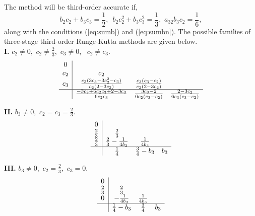\documentclass[a4paper, preprint,11pt]{elsarticle}
\numberwithin{equation}{section}
\begin{document}
The method will be third-order accurate if,
\begin{equation}\label{eq:rk_3_con}
b_2 c_2 + b_3 c_3 = \frac{1}{2},\,\,\, b_2 c_2^2 + b_3 c_3^2 = \frac{1}{3},\,\, a_{32} b_3 c_2 = \frac{1}{6},
\end{equation}
along with the conditions ({\ref{eq:sumb}}) and ({\ref{eq:sumbn}}). The possible families of three-stage third-order Runge-Kutta methods \cite{butcher2016numerical} are given below.\\

\noindent\textbf{I.} \(c_2 \neq 0\),\, \(c_2 \neq \frac{2}{3}\),\, \(c_3 \neq 0\), \, \(c_2 \neq c_3\).
\[
  \begin{array}{c|ccc}
    0 & \\
    c_2 & c_2 \\
    c_3 & \frac{c_3(3c_3 - 3c_2^2 - c_3)}{c_2(2 - 3c_2)} & \frac{c_3(c_3 - c_2)}{c_2(2 - 3c_2)} \\
    \hline
      & \frac{-3c_3 + 6c_2c_3 + 2 - 3c_3}{6c_2c_3} & \frac{3c_3 - 2}{6c_2(c_3 - c_2)} & \frac{2 - 3c_2}{6c_3(c_3 - c_2)} \\
  \end{array}
\]

\noindent\textbf{II.} \(b_3 \neq 0\),\, \(c_2 = c_3 = \frac{2}{3}\).
\[
  \begin{array}{c|ccc}
    0 & \\
    \frac{2}{3} & \frac{2}{3} \\
    \frac{2}{3} & \frac{2}{3} - \frac{1}{4b_3} & \frac{1}{4b_3} \\
    \hline
      & \frac{1}{4} & \frac{3}{4} - b_3 & b_3 \\
  \end{array}
\]

\noindent\textbf{III.} \(b_3 \neq 0\),\, \(c_2 = \frac{2}{3}\),\, \(c_3 = 0 \).
\[
  \begin{array}{c|ccc}
    0 & \\
    \frac{2}{3} & \frac{2}{3} \\
    0 & - \frac{1}{4b_3}  & \frac{1}{4b_3} \\
    \hline
      & \frac{1}{4} - b_3 & \frac{3}{4}  & b_3 \\
  \end{array}
\]
\end{document}
